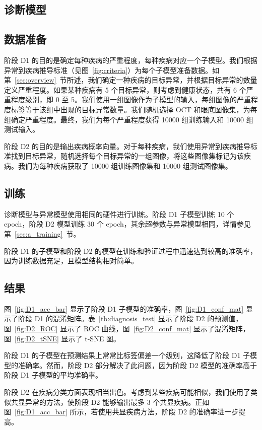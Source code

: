 \documentclass{article}
\begin{document}
	\begin{multicols}{2}
	\section{诊断模型}
	
	\subsection{数据准备}
	
	阶段 D1 的目的是确定每种疾病的严重程度，每种疾病对应一个子模型。我们根据异常到疾病推导标准（见图~\ref{fig:criteria}）为每个子模型准备数据。如第~\ref{sec:overview}~节所述，我们确定一种疾病的目标异常，并根据目标异常的数量定义严重程度。如果某种疾病有 5 个目标异常，则考虑到健康状态，共有 6 个严重程度级别，即 0 至 5。我们使用一组图像作为子模型的输入，每组图像的严重程度标签等于该组中出现的目标异常数量。我们随机选择 OCT 和眼底图像集，为每组确定严重程度。最终，我们为每个严重程度获得 10000 组训练输入和 10000 组测试输入。
	
	阶段 D2 的目的是输出疾病概率向量。对于每种疾病，我们使用异常到疾病推导标准找到目标异常，随机选择每个目标异常的一组图像，将这些图像集标记为该疾病。我们为每种疾病获取了 10000 组训练图像集和 10000 组测试图像集。
	
	\subsection{训练}
	
	诊断模型与异常模型使用相同的硬件进行训练。阶段 D1 子模型训练 10 个 epoch，阶段 D2 模型训练 30 个 epoch，其余超参数与异常模型相同，详情参见第~\ref{sec:a_training}~节。
	
	阶段 D1 的子模型和阶段 D2 的模型在训练和验证过程中迅速达到较高的准确率，因为训练数据充足，且模型结构相对简单。
	
	
	\subsection{结果}
	
	图~\ref{fig:D1_acc_bar} 显示了阶段 D1 子模型的准确率，图~\ref{fig:D1_conf_mat} 显示了阶段 D1 的混淆矩阵。表~\ref{tb:diagnosis_test} 显示了阶段 D2 的预测值，图~\ref{fig:D2_ROC} 显示了 ROC 曲线，图~\ref{fig:D2_conf_mat} 显示了混淆矩阵，图~\ref{fig:D2_tSNE} 显示了 t-SNE 图。
	
	阶段 D1 的子模型在预测结果上常常比标签偏差一个级别，这降低了阶段 D1 子模型的准确率。然而，阶段 D2 部分解决了此问题，因为阶段 D2 模型的准确率高于阶段 D1 子模型的平均准确率。
	
	阶段 D2 在疾病分类方面表现相当出色。考虑到某些疾病可能相似，我们使用了类似共显异常的方法，使阶段 D2 能够输出最多 3 个共显疾病。正如图~\ref{fig:D1_acc_bar} 所示，若使用共显疾病方法，阶段 D2 的准确率进一步提高。
	\end{multicols}
	
\end{document}
